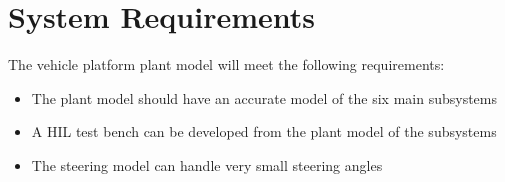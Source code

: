 \documentclass[letterpaper,12pt]{article}   %
\begin{document}

\section{System Requirements}
The vehicle platform plant model will meet the following requirements:
\begin{itemize}
    \item The plant model should have an accurate model of the six main subsystems
    \item A HIL test bench can be developed from the plant model of the subsystems
    \item The steering model can handle very small steering angles
\end{itemize}



\end{document}
